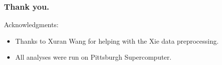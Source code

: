 \documentclass{beamer}
\begin{document}
\begin{frame}
\frametitle{Thank you.}
Acknowledgments:
\begin{itemize}
\item Thanks to Xuran Wang for helping with the Xie data preprocessing.
\item All analyses were run on Pittsburgh Supercomputer.
\end{itemize}
\end{frame}




\end{document}
